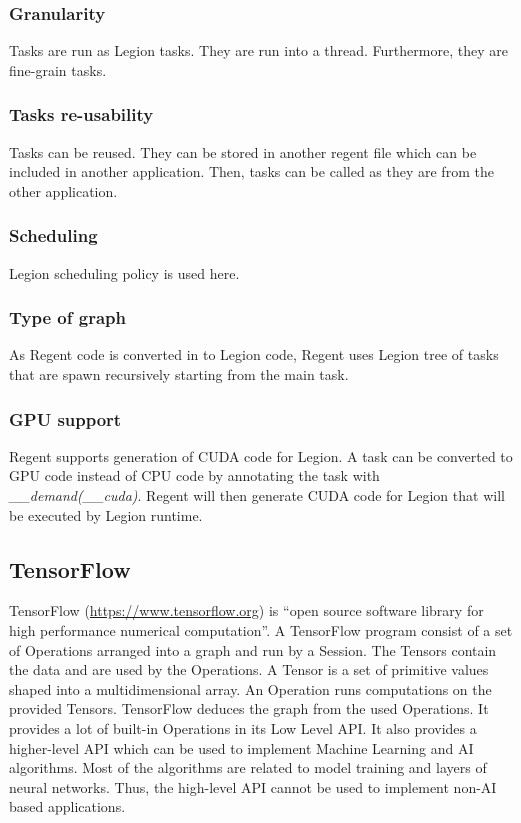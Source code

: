 \subsubsection{Granularity}
Tasks are run as Legion tasks.
They are run into a thread.
Furthermore, they are fine-grain tasks.

\subsubsection{Tasks re-usability}
Tasks can be reused.
They can be stored in another regent file which can be included in another application.
Then, tasks can be called as they are from the other application.

\subsubsection{Scheduling}
Legion scheduling policy is used here.

\subsubsection{Type of graph}
As Regent code is converted in to Legion code, Regent uses Legion tree of tasks that are spawn recursively starting from the main task.

\subsubsection{GPU support}
Regent supports generation of CUDA code for Legion.
A task can be converted to GPU code instead of CPU code by annotating the task with \textit{\_\_demand(\_\_cuda)}.
Regent will then generate CUDA code for Legion that will be executed by Legion runtime.


\subsection{TensorFlow}
TensorFlow \cite{AABBC2016} (\url{https://www.tensorflow.org}) is “open source software library for high performance numerical computation”.
A TensorFlow program consist of a set of Operations arranged into a graph and run by a Session.
The Tensors contain the data and are used by the Operations.
A Tensor is a set of primitive values shaped into a multidimensional array.
An Operation runs computations on the provided Tensors.
TensorFlow deduces the graph from the used Operations.
It provides a lot of built-in Operations in its Low Level API.
It also provides a higher-level API which can be used to implement Machine Learning and AI algorithms.
Most of the algorithms are related to model training and layers of neural networks.
Thus, the high-level API cannot be used to implement non-AI based applications.

